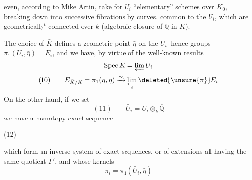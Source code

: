 even, according to Mike Artin, take for $U_i$ ``elementary'' schemes over $K_0$, breaking down into successive fibrations by curves.   common to the $U_i$, which are geometrically$^t$ connected  over  $k$ (algebraic closure of $\mathbb Q$ in $K$).

The choice of $\bar K$ defines a geometric point $\bar\eta$ on the $U_i$, hence groups $\pi_1(U_i,\bar\eta)=E_i$, and we have, by virtue of the well-known results
\[
\operatorname{Spec}K=\varprojlim U_i
\]
\[
(10)\qquad E_{\bar K/K}=\pi_1(\eta,\bar\eta)\xrightarrow{\sim}\varprojlim_i\deleted{\unsure{\pi}}E_i
\]
On the other hand, if we set
\[
(11)\qquad\bar U_i=U_i\otimes_k\overline{\mathbb Q}
\]
we have  a homotopy exact sequence

\noindent (12)\quad{}

which form an inverse system of exact sequences, or of extensions all having the same quotient $\Gamma'$, and whose kernels
\[
\pi_i=\pi_1(\bar U_i,\bar\eta)
\]
